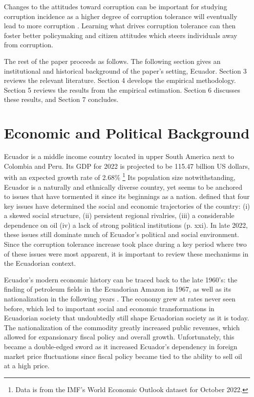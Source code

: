 \documentclass[12pt,a4]{article}\usepackage[]{graphicx}\usepackage[]{xcolor}
\begin{document}
Changes to the attitudes toward corruption can be important for studying corruption incidence as a higher degree of corruption tolerance will eventually lead to more corruption \parencite{Campbell.2014, Ariely.2019}. Learning what drives corruption tolerance can then foster better policymaking and citizen attitudes which steers individuals away from corruption.

The rest of the paper proceeds as follows. The following section gives an institutional and historical background of the paper's setting, Ecuador. Section 3 reviews the relevant literature. Section 4 develops the empirical methodology. Section 5 reviews the results from the empirical estimation. Section 6 discusses these results, and Section 7 concludes. 




\section{Economic and Political Background}
\label{sec:background}

Ecuador is a middle income country located in upper South America next to Colombia and Peru. Its GDP for 2022 is projected to be 115.47 billion US dollars, with an expected growth rate of 2.68\% \footnote{Data is from the IMF's World Economic Outlook dataset for October 2022.} Its population size notwithstanding, Ecuador is a naturally and ethnically diverse country, yet seems to be anchored to issues that have tormented it since its beginnings as a nation. \textcite{FederalResearchDivision.1991} defined that four key issues have determined the social and economic trajectories of the country: (i) a skewed social structure, (ii) persistent regional rivalries, (iii) a considerable dependence on oil (iv) a lack of strong political institutions (p. xxi). In late 2022, these issues still dominate much of Ecuador's political and social environment. Since the corruption tolerance increase took place during a key period where two of these issues were most apparent, it is important to review these mechanisms in the Ecuadorian context. 

Ecuador's modern economic history can be traced back to the late 1960's: the finding of petroleum fields in the Ecuadorian Amazon in 1967, as well as its nationalization in the following years \parencite{EmpresaPublicaPetroEcuador.2013}. The economy grew at rates never seen before, which led to important social and economic transformations in Ecuadorian society \textcite{Hurtado.2007, FederalResearchDivision.1991} that undoubtedly still shape Ecuadorian society as it is today. The nationalization of the commodity greatly increased public revenues, which allowed for expansionary fiscal policy and overall growth. Unfortunately, this became a double-edged sword as it increased Ecuador’s dependency in foreign market price fluctuations since fiscal policy became tied to the ability to sell oil at a high price.
\end{document}
